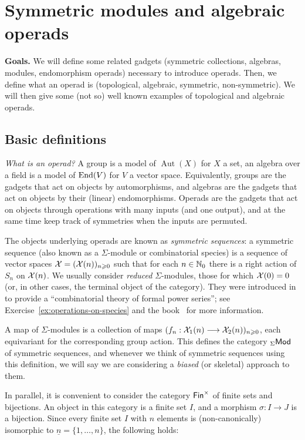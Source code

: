 \section{Symmetric modules and algebraic operads}\label{lecture:thebasics}

\textbf{Goals.}
We will define
some related gadgets (symmetric collections,
algebras, modules, endomorphism operads)
necessary to introduce operads. 
Then, we define what an operad is (topological,
algebraic, symmetric, non-symmetric). 
We will then give some
(not so) well known examples of topological
and algebraic operads.

\subsection{Basic definitions}
\emph{What is an operad?} A group is a model of
$\operatorname{Aut}(X)$ for $X$ a set, an algebra
over a field
is a model of $\operatorname{End}(V)$ for $V$
a vector space. Equivalently, groups are the
gadgets that act on objects by automorphisms,
and algebras are the gadgets that act
on objects by their (linear) endomorphisms. 
Operads are the gadgets that act on
objects through operations with many 
inputs (and one output), and at the same
time keep track of symmetries when
the inputs are permuted.

The  objects underlying operads are known as
\emph{symmetric sequences}: a symmetric sequence
(also known as a $\Sigma$-module or combinatorial 
species) is a sequence of vector spaces
$\mathcal{X} = (\mathcal{X}(n))_{n\geqslant 0}$ such that for
each $n\in\mathbb N_0$ there is a right action of
$S_n$ on $\mathcal{X}(n)$. We usually consider \emph{reduced}
$\Sigma$-modules, those for which $\mathcal{X}(0)=0$
(or, in other cases, the terminal object of the
category). They were introduced in~\cite{Joyal1981}
to provide a ``combinatorial theory of formal
power series''; see Exercise~\ref{ex:operations-on-species} and 
the book~\cite{Bergeron1997} for more information.

A map of $\Sigma$-modules is a collection of maps
$(f_n : \mathcal{X}_1(n) \longrightarrow \mathcal{X}_2(n))_{n\geqslant 0}$,
each equivariant for the corresponding group action. 
This defines the category ${}_\Sigma\mathsf{Mod}$ of symmetric
sequences, and whenever we think of symmetric sequences
using this definition, we will say we are considering  
a \emph{biased} (or skeletal) approach to them.

In parallel, it is convenient to consider the 
category $\mathsf{Fin}^\times$ of finite sets and bijections.
An object in this category is a finite set $I$,
and a morphism $\sigma : I\longrightarrow J$ is a
bijection. Since every finite set $I$ with $n$
elements is (non-canonically) isomorphic to 
$\underline{n} =\{1,\ldots,n\}$, the following holds:

